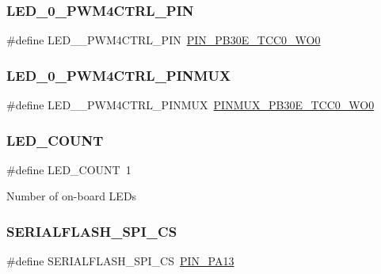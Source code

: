 \subsubsection{\texorpdfstring{LED\_0\_PWM4CTRL\_PIN}{LED\_0\_PWM4CTRL\_PIN}}
{\footnotesize\ttfamily \#define L\+E\+D\+\_\+\_\+\+P\+W\+M4\+C\+T\+R\+L\+\_\+\+P\+IN~\mbox{\hyperlink{pio_2samd21j18a_8h_a7d988f237e01b9124bee7d1e7b422315}{P\+I\+N\+\_\+\+P\+B30\+E\+\_\+\+T\+C\+C0\+\_\+\+W\+O0}}}

\mbox{\label{group__samd21__xplained__pro__features__group_gaf65e221d66d5ee899dc2fc2b1c264a01}} 
\subsubsection{\texorpdfstring{LED\_0\_PWM4CTRL\_PINMUX}{LED\_0\_PWM4CTRL\_PINMUX}}
{\footnotesize\ttfamily \#define L\+E\+D\+\_\+\_\+\+P\+W\+M4\+C\+T\+R\+L\+\_\+\+P\+I\+N\+M\+UX~\mbox{\hyperlink{pio_2samd21j18a_8h_a4cf0084dd2785676f29c8f84cb5ec96d}{P\+I\+N\+M\+U\+X\+\_\+\+P\+B30\+E\+\_\+\+T\+C\+C0\+\_\+\+W\+O0}}}

\mbox{\label{group__samd21__xplained__pro__features__group_gad698e2cb680601529f08c3e5f2b0cebb}} 
\subsubsection{\texorpdfstring{LED\_COUNT}{LED\_COUNT}}
{\footnotesize\ttfamily \#define L\+E\+D\+\_\+\+C\+O\+U\+NT~1}

Number of on-\/board L\+E\+Ds \mbox{\label{group__samd21__xplained__pro__features__group_ga5b501e0aa033a8282d91fe663e9c7bf9}} 
\subsubsection{\texorpdfstring{SERIALFLASH\_SPI\_CS}{SERIALFLASH\_SPI\_CS}}
{\footnotesize\ttfamily \#define S\+E\+R\+I\+A\+L\+F\+L\+A\+S\+H\+\_\+\+S\+P\+I\+\_\+\+CS~\mbox{\hyperlink{pio_2samd21j18a_8h_a4180bdc6fd7252cff2ffe28176866028}{P\+I\+N\+\_\+\+P\+A13}}}

